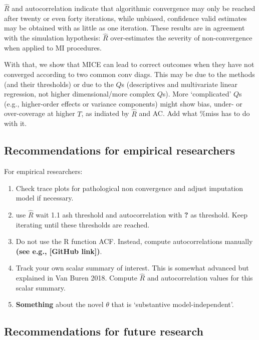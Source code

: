 \documentclass[Royal,times,sageh]{sagej}
\begin{document}
\(\widehat{R}\) and autocorrelation indicate that algorithmic
convergence may only be reached after twenty or even forty iterations,
while unbiased, confidence valid estimates may be obtained with as
little as one iteration. These results are in agreement with the
simulation hypothesis: \(\widehat{R}\) over-estimates the severity of
non-convergence when applied to MI procedures.

With that, we show that MICE can lead to correct outcomes when they have
not converged according to two common conv diags. This may be due to the
methods (and their thresholds) or due to the \(Q\)s (descriptives and
multivariate linear regression, not higher dimensional/more complex
\(Q\)s). More `complicated' \(Q\)s (e.g., higher-order effects or
variance components) might show bias, under- or over-coverage at higher
\(T\), as indiated by \(\widehat{R}\) and AC. Add what \%miss has to do
with it.

\hypertarget{recommendations-for-empirical-researchers}{%
\subsection{Recommendations for empirical
researchers}\label{recommendations-for-empirical-researchers}}

For empirical researchers:

\begin{enumerate}
\def\labelenumi{\arabic{enumi}.}
\item
  Check trace plots for pathological non convergence and adjust
  imputation model if necessary.
\item
  use \(\widehat{R}\) wait 1.1 ash threshold and autocorrelation with
  \textbf{?} as threshold. Keep iterating until these thresholds are
  reached.
\item
  Do not use the R function ACF. Instead, compute autocorrelations
  manually \textbf{(see e.g., {[}GitHub link{]})}.
\item
  Track your own scalar summary of interest. This is somewhat advanced
  but explained in Van Buren 2018. Compute \(\widehat{R}\) and
  autocorrelation values for this scalar summary.
\item
  \textbf{Something} about the novel \(\theta\) that is `substantive
  model-independent'.
\end{enumerate}

\hypertarget{recommendations-for-future-research}{%
\subsection{Recommendations for future
research}\label{recommendations-for-future-research}}
\end{document}
